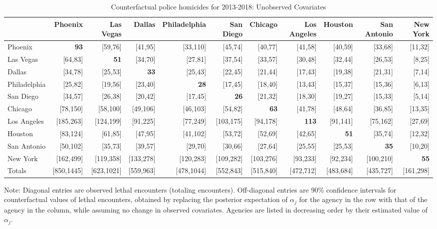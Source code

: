 \begin{table}[h!]\centering\scriptsize\tabcolsep=0.1cm\caption{Counterfactual police homicides for 2013-2018: Unobserved Covariates} \label{table:counterfactual_unobs}\begin{tabular}{lrrrrrrrrrr}\hline \hline&Phoenix&Las Vegas&Dallas&Philadelphia&San Diego&Chicago&Los Angeles&Houston&San Antonio&New York\\
\hline
Phoenix&\textbf{93}&[59,76]&[41,95]&[33,110]&[45,74]&[40,77]&[41,58]&[40,59]&[33,68]&[11,32]\\
Las Vegas&[64,83]&\textbf{51}&[34,70]&[27,81]&[37,54]&[33,57]&[30,48]&[32,44]&[26,53]&[8,25]\\
Dallas&[34,78]&[25,53]&\textbf{33}&[25,43]&[22,45]&[21,44]&[17,43]&[19,38]&[21,31]&[7,14]\\
Philadelphia&[25,82]&[19,56]&[23,40]&\textbf{28}&[17,45]&[18,40]&[13,43]&[15,37]&[15,36]&[6,13]\\
San Diego&[34,57]&[26,38]&[20,42]&[17,45]&\textbf{26}&[21,32]&[18,30]&[19,27]&[15,33]&[5,14]\\
Chicago&[78,150]&[58,100]&[49,106]&[46,103]&[54,82]&\textbf{63}&[41,78]&[48,64]&[36,85]&[13,35]\\
Los Angeles&[185,263]&[124,199]&[91,225]&[77,249]&[103,175]&[94,178]&\textbf{113}&[91,141]&[75,162]&[27,69]\\
Houston&[83,124]&[61,85]&[47,95]&[41,102]&[53,72]&[52,69]&[42,65]&\textbf{51}&[35,74]&[12,32]\\
San Antonio&[50,102]&[35,73]&[39,57]&[29,70]&[30,66]&[27,64]&[25,55]&[25,53]&\textbf{35}&[10,20]\\
New York&[162,499]&[119,358]&[133,278]&[120,283]&[109,282]&[103,276]&[93,233]&[92,234]&[100,210]&\textbf{55}\\
\hline
Totals&[850,1445]&[623,1021]&[559,963]&[478,1044]&[552,843]&[515,840]&[472,712]&[483,684]&[435,727]&[161,298]\\
\hline\end{tabular}\begin{center}\begin{minipage}{1.05\textwidth} %
 {\footnotesize {\schape Note}: Diagonal entries are observed lethal encounters (totaling \totalincidentsten{} encounters). Off-diagonal entries are 90\% confidence intervals for counterfactual values of lethal encounters, obtained by replacing the posterior expectation of $\alpha_j$ for the agency in the row with that of the agency in the column, while assuming no change in observed covariates. Agencies are listed in decreasing order by their estimated value of $\alpha_j$.} 
 \end{minipage} 
 \end{center} 
 \end{table} 
